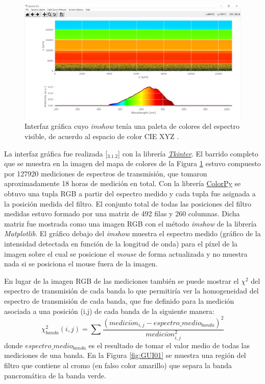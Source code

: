\begin{figure}[H]
	\centering
	\includegraphics[width=1.0\textwidth]{Figs/microespectrometro/guirgb.png}
	\caption{Interfaz gráfica cuyo \textit{imshow} tenía una paleta de colores del espectro visible, de acuerdo al espacio de color CIE XYZ \cite{Wyman}.}
	\label{fig:GUI00}
\end{figure}


La interfaz gráfica fue realizada [\href{https://github.com/jrr1984/Prototipo0\_S-D\_SpectralGUI/blob/master/spectral\_gui/main.py}{\faGithub$_{3.1.2}$}] con la librería \href{https://wiki.python.org/moin/TkInter}{\textit{Tkinter}}. El barrido completo que se muestra en la imagen del mapa de colores de la Figura \ref{fig:GUI00} estuvo compuesto por 127920 mediciones de espectros de transmisión, que tomaron aproximadamente 18 horas de medición en total. Con la librería \href{https://pypi.org/project/colorpy/}{ColorPy} se obtuvo una tupla RGB a partir del espectro medido y cada tupla fue asignada a la posición medida del filtro. El conjunto total de todas las posiciones del filtro medidas estuvo formado por una matriz de 492 filas y 260 columnas. Dicha matriz fue mostrada como una imagen RGB con el método \textit{imshow} de la librería \textit{Matplotlib}. El gráfico debajo del \textit{imshow} muestra el espectro medido (gráfico de la intensidad detectada en función de la longitud de onda) para el píxel de la imagen sobre el cual se posicione el \textit{mouse} de forma actualizada y no muestra nada si se posiciona el mouse fuera de la imagen. 

En lugar de la imagen RGB de las mediciones también se puede mostrar el $\chi^{2}$ del espectro de transmisión de cada banda lo que permitiría ver la homogeneidad del espectro de transmisión de cada banda, que fue definido para la medición asociada a una posición (i,j) de cada banda de la siguiente manera:
\begin{equation}
\chi^{2}_{banda}(i,j) = \sum \frac{(medici\acute{o}n_{i,j} - espectro\_medio_{banda})^{2}}{medici\acute{o}n^{2}_{i,j}}
\end{equation}
donde $espectro\_medio_{banda}$ es el resultado de tomar el valor medio de todas las mediciones de una banda. En la Figura \ref{fig:GUI01} se muestra una región del filtro que contiene al cromo (en falso color amarillo) que separa la banda pancromática de la banda verde. 

